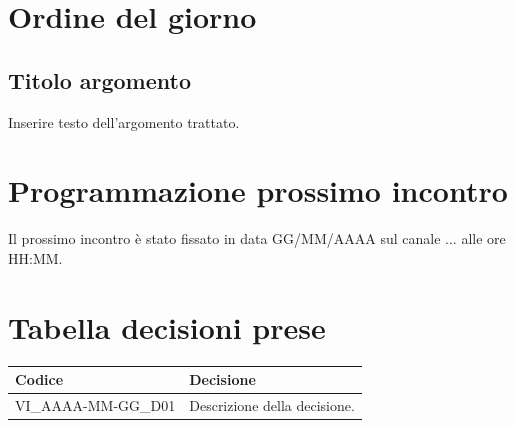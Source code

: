 \newpage
\vspace{0.8cm}

\section{Ordine del giorno}

\subsection{Titolo argomento}
Inserire testo dell'argomento trattato.

\section{Programmazione prossimo incontro}
Il prossimo incontro è stato fissato in data GG/MM/AAAA sul canale ... alle ore HH:MM.

\section{Tabella decisioni prese}
\renewcommand{\arraystretch}{1.3}
\noindent
\begin{tabularx}{\textwidth}{|l|X|}
    \hline
    \textbf{Codice} & \textbf{Decisione} \\
    \hline
    VI\_AAAA-MM-GG\_D01 & Descrizione della decisione. \\
    \hline
\end{tabularx}

